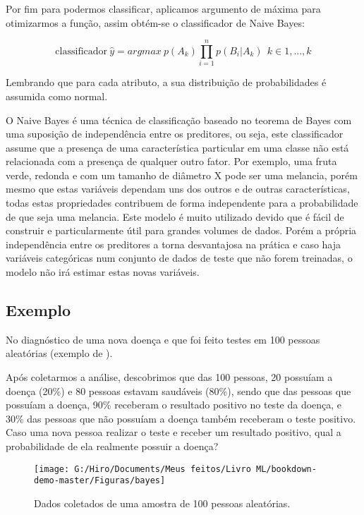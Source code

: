\documentclass[
]{book}
\begin{document}
Por fim para podermos classificar, aplicamos argumento de máxima para otimizarmos a função, assim obtém-se o classificador de Naive Bayes:

\begin{equation} 
  \mbox{classificador} \ \hat{y}=argmax \ p(A_k)\displaystyle \prod_{i=1}^n p(B_i|A_k) \ \ k ∈{1,...,k}
  \label{eq:naivebayes}
\end{equation}

Lembrando que para cada atributo, a sua distribuição de probabilidades é assumida como normal.

O Naive Bayes é uma técnica de classificação baseado no teorema de Bayes com uma suposição de independência entre os preditores, ou seja, este classificador assume que a presença de uma característica particular em uma classe não está relacionada com a presença de qualquer outro fator. Por exemplo, uma fruta verde, redonda e com um tamanho de diâmetro X pode ser uma melancia, porém mesmo que estas variáveis dependam uns dos outros e de outras características, todas estas propriedades contribuem de forma independente para a probabilidade de que seja uma melancia. Este modelo é muito utilizado devido que é fácil de construir e particularmente útil para grandes volumes de dados. Porém a própria independência entre os preditores a torna desvantajosa na prática e caso haja variáveis categóricas num conjunto de dados de teste que não forem treinadas, o modelo não irá estimar estas novas variáveis.

\hypertarget{exbayes}{%
\subsection{Exemplo}\label{exbayes}}

No diagnóstico de uma nova doença e que foi feito testes em 100 pessoas aleatórias (exemplo de \citet{organica}).

Após coletarmos a análise, descobrimos que das 100 pessoas, 20 possuíam a doença (20\%) e 80 pessoas estavam saudáveis (80\%), sendo que das pessoas que possuíam a doença, 90\% receberam o resultado positivo no teste da doença, e 30\% das pessoas que não possuíam a doença também receberam o teste positivo. Caso uma nova pessoa realizar o teste e receber um resultado positivo, qual a probabilidade de ela realmente possuir a doença?

\begin{figure}

{\centering \texttt{[image: G:/Hiro/Documents/Meus feitos/Livro ML/bookdown-demo-master/Figuras/bayes]} 

}

\caption{Dados coletados de uma amostra de 100 pessoas aleatórias.}\label{fig:bayes}
\end{figure}
\end{document}
